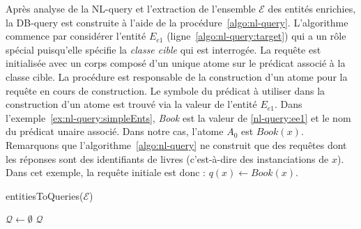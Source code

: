 Après analyse de la NL-query et l'extraction de l'ensemble $\mathcal{E}$ des entités enrichies, la DB-query est construite à l'aide de la procédure~\ref{algo:nl-query}.
L'algorithme commence par considérer l'entité $E_{e1}$ (ligne~\ref{algo:nl-query:target}) qui a un rôle spécial puisqu'elle spécifie la \emph{classe cible} qui est interrogée.
La requête est initialisée avec un corps composé d'un unique atome sur le prédicat associé à la classe cible.
La procédure \BuildAtom est responsable de la construction d'un atome pour la requête en cours de construction.
Le symbole du prédicat à utiliser dans la construction d'un atome est trouvé via la valeur de l'entité $E_{e1}$.
Dans l'exemple~\ref{ex:nl-query:simpleEnts}, \emph{Book} est la valeur de \ref{nl-query:ee1} et le nom du prédicat unaire associé.
Dans notre cas, l'atome $A_0$ est $Book(x)$.
Remarquons que l'algorithme~\ref{algo:nl-query} ne construit que des requêtes dont les réponses sont des identifiants de livres (c'est-à-dire des instanciations de $x$).
Dans cet exemple, la requête initiale est donc : $q(x) \leftarrow Book(x)$.

\begin{procedure}[htb]
    \caption{entitiesToQueries($\mathcal{E}$)}
    \label{algo:nl-query}


    $\mathcal{Q} \gets \emptyset$ \;
    \Return $\mathcal{Q}$ \;
\end{procedure}

